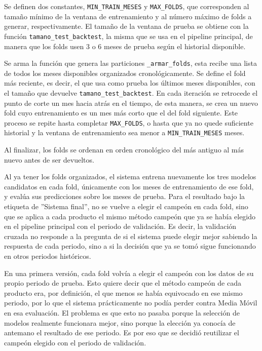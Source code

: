 Se definen dos constantes, \texttt{MIN\_TRAIN\_MESES} y \texttt{MAX\_FOLDS}, que corresponden al tamaño mínimo de la ventana de entrenamiento y al número máximo de folds a generar, respectivamente. El tamaño de la ventana de prueba se obtiene con la función \texttt{tamano\_test\_backtest}, la misma que se usa en el pipeline principal, de manera que los folds usen 3 o 6 meses de prueba según el historial disponible.

Se arma la función que genera las particiones \texttt{\_armar\_folds}, esta recibe una lista de todos los meses disponibles organizados cronológicamente. Se define el fold más reciente, es decir, el que usa como prueba los últimos meses disponibles, con el tamaño que devuelve \texttt{tamano\_test\_backtest}. En cada iteración se retrocede el punto de corte un mes hacia atrás en el tiempo, de esta manera, se crea un nuevo fold cuyo entrenamiento es un mes más corto que el del fold siguiente. Este proceso se repite hasta completar \texttt{MAX\_FOLDS}, o hasta que ya no quede suficiente historial y la ventana de entrenamiento sea menor a \texttt{MIN\_TRAIN\_MESES} meses.

Al finalizar, los folds se ordenan en orden cronológico del más antiguo al más nuevo antes de ser devueltos.

Al ya tener los folds organizados, el sistema entrena nuevamente los tres modelos candidatos en cada fold, únicamente con los meses de entrenamiento de ese fold, y evalúa sus predicciones sobre los meses de prueba. Para el resultado bajo la etiqueta de ”Sistema final”, no se vuelve a elegir el campeón en cada fold, sino que se aplica a cada producto el mismo método campeón que ya se había elegido en el pipeline principal con el periodo de validación. Es decir, la validación cruzada no responde a la pregunta de si el sistema puede elegir mejor sabiendo la respuesta de cada periodo, sino a si la decisión que ya se tomó sigue funcionando en otros periodos históricos.

En una primera versión, cada fold volvía a elegir el campeón con los datos de su propio periodo de prueba. Esto quiere decir que el método campeón de cada producto era, por definición, el que menos se había equivocado en ese mismo periodo, por lo que el sistema prácticamente no podía perder contra Media Móvil en esa evaluación. El problema es que esto no pasaba porque la selección de modelos realmente funcionara mejor, sino porque la elección ya conocía de antemano el resultado de ese periodo. Es por eso que se decidió reutilizar el campeón elegido con el periodo de validación.

